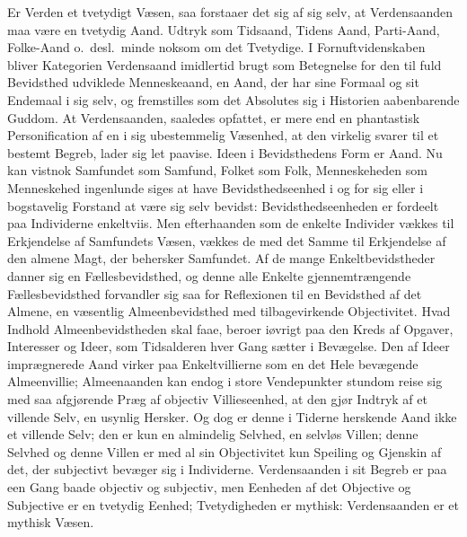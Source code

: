 \documentclass[12pt]{book}
\begin{document}
Er Verden et tvetydigt Væsen, saa forstaaer det sig af sig selv, at
Verdensaanden maa være en tvetydig Aand. Udtryk som Tidsaand, Tidens
Aand, Parti-Aand, Folke-Aand o.\ desl.\ minde noksom om det
Tvetydige. I Fornuftvidenskaben bliver Kategorien Verdensaand
imidlertid brugt som Betegnelse for den til fuld Bevidsthed udviklede
Menneskeaand, en Aand, der har sine Formaal og sit Endemaal i sig
selv, og fremstilles som det Absolutes sig i Historien aabenbarende
Guddom. At Verdensaanden, saaledes opfattet, er mere end en
phantastisk Personification af en i sig ubestemmelig Væsenhed, at
den virkelig svarer til et bestemt Begreb, lader sig let paavise.
Ideen i Bevidsthedens Form er Aand. Nu kan vistnok Samfundet som
Samfund, Folket som Folk, Menneskeheden som Menneskehed ingenlunde
siges at have Bevidsthedseenhed i og for sig eller i bogstavelig
Forstand at være sig selv bevidst: Bevidsthedseenheden er fordeelt
paa Individerne enkeltviis. Men efterhaanden som de enkelte
Individer vækkes til Erkjendelse af Samfundets Væsen, vækkes de med
det Samme til Erkjendelse af den almene Magt, der behersker
Samfundet. Af de mange Enkeltbevidstheder danner sig en
Fællesbevidsthed, og denne alle Enkelte gjennemtrængende
Fællesbevidsthed forvandler sig saa for Reflexionen til en
Bevidsthed af det Almene, en væsentlig Almeenbevidsthed med
tilbagevirkende Objectivitet. Hvad Indhold Almeenbevidstheden skal
faae, beroer iøvrigt paa den Kreds af Opgaver, Interesser og Ideer,
som Tidsalderen hver Gang sætter i Bevægelse. Den af Ideer
imprægnerede Aand virker paa Enkeltvillierne som en det Hele
bevægende Almeenvillie; Almeenaanden kan endog i store Vendepunkter
stundom reise sig med saa afgjørende Præg af objectiv
Villieseenhed, at den gjør Indtryk af et villende Selv, en usynlig
Hersker. Og dog er denne i Tiderne herskende Aand ikke et villende
Selv; den er kun en almindelig Selvhed, en selvløs Villen; denne
Selvhed og denne Villen er med al sin Objectivitet kun Speiling og
Gjenskin af det, der subjectivt bevæger sig i Individerne.
Verdensaanden i sit Begreb er paa een Gang baade objectiv og
subjectiv, men Eenheden af det Objective og Subjective er en
tvetydig Eenhed; Tvetydigheden er mythisk: Verdensaanden er et
mythisk Væsen.
\end{document}
